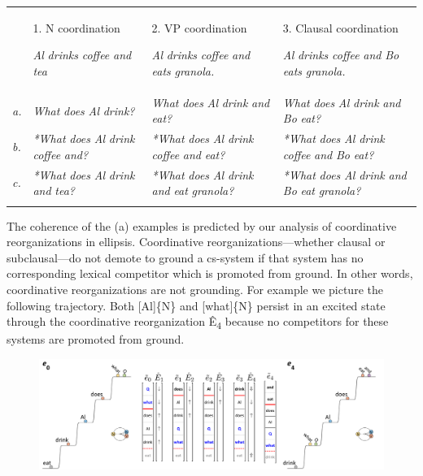 \begin{tabularx}{\textwidth}{XXXX}
\lsptoprule
& 1. N coordination

\textit{Al} \textit{drinks} \textit{coffee} \textit{and} \textit{tea} & 2. VP coordination

\textit{Al} \textit{drinks} \textit{coffee} \textit{and} \textit{eats} \textit{granola.} & 3. Clausal coordination

\textit{Al} \textit{drinks} \textit{coffee} \textit{and} \textit{Bo} \textit{eats} \textit{granola.}\\
\textit{a.} & \textit{What} \textit{does} \textit{Al} \textit{drink?} & \textit{What} \textit{does} \textit{Al} \textit{drink} \textit{and} \textit{eat?} & \textit{What} \textit{does} \textit{Al} \textit{drink} \textit{and} \textit{Bo} \textit{eat?}\\
\textit{b.} & \textit{*What} \textit{does} \textit{Al} \textit{drink} \textit{coffee} \textit{and?} & \textit{*What} \textit{does} \textit{Al} \textit{drink} \textit{coffee} \textit{and} \textit{eat?} & \textit{*What} \textit{does} \textit{Al} \textit{drink} \textit{coffee} \textit{and} \textit{Bo} \textit{eat?}\\
\textit{c.} & \textit{*What} \textit{does} \textit{Al} \textit{drink} \textit{and} \textit{tea?} & \textit{*What} \textit{does} \textit{Al} \textit{drink} \textit{and} \textit{eat} \textit{granola?} & \textit{*What} \textit{does} \textit{Al} \textit{drink} \textit{and} \textit{Bo} \textit{eat} \textit{granola?}\\
\lspbottomrule
\end{tabularx}
  The coherence of the (a) examples is predicted by our analysis of coordinative reorganizations in ellipsis. Coordinative reorganizations—whether clausal or subclausal—do not demote to ground a cs-system if that system has no corresponding lexical competitor which is promoted from ground. In other words, coordinative reorganizations are not grounding. For example  we picture the following trajectory. Both [Al]\{N\} and [what]\{N\} persist in an excited state through the coordinative reorganization Ê\textsubscript{4} because no competitors for these systems are promoted from ground.

  
\begin{figure}
\includegraphics[width=\textwidth]{figures/Tilsen-img165.png}
\caption{\missingcaption}
\label{fig:}
\end{figure}
 

